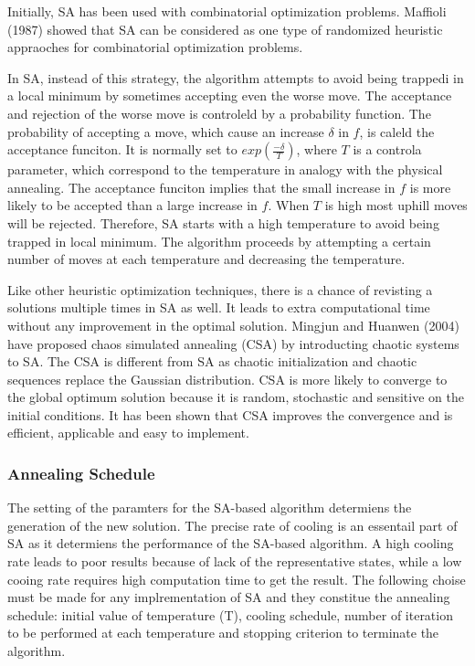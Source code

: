 \documentclass[pdftex,11pt]{article}
\begin{document}
Initially, SA has been used with combinatorial optimization problems. Maffioli (1987) showed that SA can be considered as one type of randomized heuristic appraoches for combinatorial optimization problems.

In SA, instead of this strategy, the algorithm attempts to avoid being trappedi in a local minimum by sometimes accepting even the worse move. The acceptance and rejection of the worse move is controleld by a probability function. The probability of accepting a move, which cause an increase $\delta$ in $f$, is caleld the acceptance funciton. It is normally set to $exp(\frac{-\delta}{T})$, where $T$ is a controla parameter, which correspond to the temperature in analogy with the physical annealing. The acceptance funciton implies that the small increase in $f$ is more likely to be accepted than a large increase in $f$. When $T$ is high most uphill moves will be rejected. Therefore, SA starts with a high temperature to avoid being trapped in local minimum. The algorithm proceeds by attempting a certain number of moves at each temperature and decreasing the temperature.

Like other heuristic optimization techniques, there is a chance of revisting a solutions multiple times in SA as well. It leads to extra computational time without any improvement in the optimal solution. Mingjun and Huanwen (2004) have proposed chaos simulated annealing (CSA) by introducting chaotic systems to SA. The CSA is different from SA as chaotic initialization and chaotic sequences replace the Gaussian distribution. CSA is more likely to converge to the global optimum solution because it is random, stochastic and sensitive on the initial conditions. It has been shown that CSA improves the convergence and is efficient, applicable and easy to implement.

\subsubsection{Annealing Schedule}
The setting of the paramters for the SA-based algorithm determiens the generation of the new solution. The precise rate of cooling is an essentail part of SA as it determiens the performance of the SA-based algorithm. A high cooling rate leads to poor results because of lack of the representative states, while a low cooing rate requires high computation time to get the result. The following choise must be made for any implrementation of SA and they constitue the annealing schedule: initial value of temperature (T), cooling schedule, number of iteration to be performed at each temperature and stopping criterion to terminate the algorithm.
\end{document}
